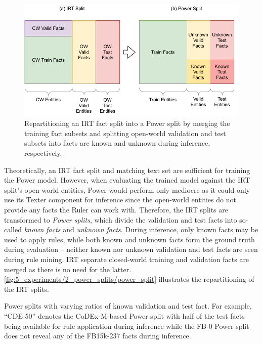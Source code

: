 \begin{figure}[t]
    \centering
    \includegraphics[width=\textwidth]{5_experiments/2_power_splits/power_split}
    \caption{Repartitioning an IRT fact split into a Power split by merging the training fact subsets and splitting open-world validation and test subsets into facts are known and unknown during inference, respectively.}
    \label{fig:5_experiments/2_power_splits/power_split}
\end{figure}

Theoretically, an IRT fact split and matching text set are sufficient for training the Power model. However, when evaluating the trained model against the IRT split's open-world entities, Power would perform only mediocre as it could only use its Texter component for inference since the open-world entities do not provide any facts the Ruler can work with. Therefore, the IRT splits are transformed to \emph{Power splits}, which divide the validation and test facts into so-called \emph{known facts} and \emph{unknown facts}. During inference, only known facts may be used to apply rules, while both known and unknown facts form the ground truth during evaluation -- neither known nor unknown validation and test facts are seen during rule mining. IRT separate closed-world training and validation facts are merged as there is no need for the latter. \autoref{fig:5_experiments/2_power_splits/power_split} illustrates the repartitioning of the IRT splits.

\begin{table}[t]
    \centering
    
    \caption{Power splits with varying ratios of known validation and test fact. For example, ``CDE-50'' denotes the CoDEx-M-based Power split with half of the test facts being available for rule application during inference while the FB-0 Power split does not reveal any of the FB15k-237 facts during inference.}
    \label{tab:5_experiments/2_power_splits/power_splits_table}
\end{table}

